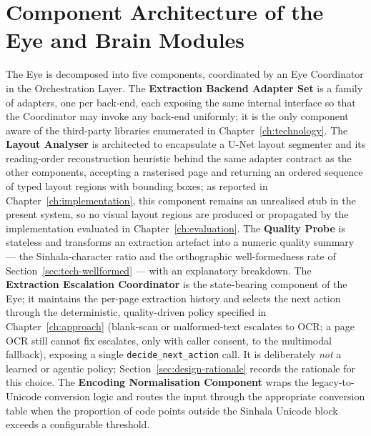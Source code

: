 \documentclass[12pt,a4paper,oneside]{report}
\begin{document}
\section{Component Architecture of the Eye and Brain Modules}
\label{sec:design-eye-arch}
\label{sec:design-brain-arch}
The Eye is decomposed into five components, coordinated by an Eye Coordinator in the Orchestration Layer. The \textbf{Extraction Backend Adapter Set} is a family of adapters, one per back-end, each exposing the same internal interface so that the Coordinator may invoke any back-end uniformly; it is the only component aware of the third-party libraries enumerated in Chapter~\ref{ch:technology}. The \textbf{Layout Analyser} is architected to encapsulate a U-Net layout segmenter and its reading-order reconstruction heuristic behind the same adapter contract as the other components, accepting a rasterised page and returning an ordered sequence of typed layout regions with bounding boxes; as reported in Chapter~\ref{ch:implementation}, this component remains an unrealised stub in the present system, so no visual layout regions are produced or propagated by the implementation evaluated in Chapter~\ref{ch:evaluation}. The \textbf{Quality Probe} is stateless and transforms an extraction artefact into a numeric quality summary — the Sinhala-character ratio and the orthographic well-formedness rate of Section~\ref{sec:tech-wellformed} — with an explanatory breakdown. The \textbf{Extraction Escalation Coordinator} is the state-bearing component of the Eye; it maintains the per-page extraction history and selects the next action through the deterministic, quality-driven policy specified in Chapter~\ref{ch:approach} (blank-scan or malformed-text escalates to OCR; a page OCR still cannot fix escalates, only with caller consent, to the multimodal fallback), exposing a single \texttt{decide\_next\_action} call. It is deliberately \textit{not} a learned or agentic policy; Section~\ref{sec:design-rationale} records the rationale for this choice. The \textbf{Encoding Normalisation Component} wraps the legacy-to-Unicode conversion logic and routes the input through the appropriate conversion table when the proportion of code points outside the Sinhala Unicode block exceeds a configurable threshold.
\end{document}
